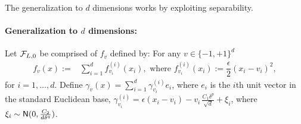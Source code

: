 The generalization to $d$ dimensions works by exploiting separability.
\paragraph{Generalization to $d$ dimensions:}
Let $\mathcal{F}_{L,0}$ be comprised of $f_v$ defined by: For any $v\in \{-1,+1\}^d$
\begin{align*}
  f_v(x) :=& \sum_{i=1}^d f^{(i)}_{v_i}(x_i), \text{ where } f^{(i)}_{v_i}(x_i) := \dfrac{\epsilon}{2} (x_i - v_i)^2,
\end{align*}
for $i=1,\ldots,d$.
Define
$\gamma_v(x) = \sum_{i=1}^d \gamma_{v_i}^{(i)}e_i$, where 
$e_i$ is the $i$th unit vector in the standard Euclidean base,
$\gamma_{v_i}^{(i)} = \epsilon(x_i-v_i) - v_i\, \frac{C_1 \delta^p}{\sqrt{d}} + \xi_i$, where $\xi_i \sim \mathsf{N}(0,\frac{C_2}{d\delta^q})$. 

